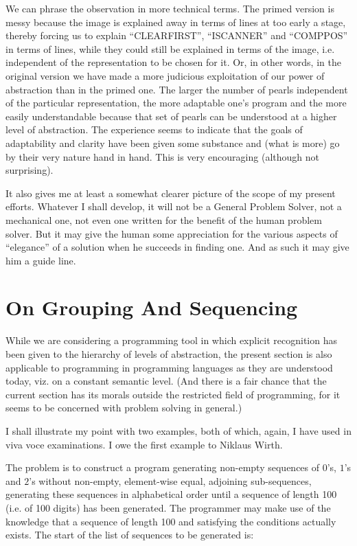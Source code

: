We can phrase the observation in more technical terms. The primed version is messy because the image is explained away in terms of lines at too early a stage, thereby forcing us to explain ``CLEARFIRST'', ``ISCANNER'' and ``COMPPOS'' in terms of lines, while they could still be explained in terms of the image, i.e. independent of the representation to be chosen for it. Or, in other words, in the original version we have made a more judicious exploitation of our power of abstraction than in the primed one. The larger the number of pearls independent of the particular representation, the more adaptable one's program and the more easily understandable \textemdash{}  because that set of pearls can be understood at a higher level of abstraction. The experience seems to indicate that the goals of adaptability and clarity have been given some substance and (what is more) go by their very nature hand in hand. This is very encouraging (although not surprising).

It also gives \textemdash{}  me at least \textemdash{}  a somewhat clearer picture of the scope of my present efforts. Whatever I shall develop, it will not be a General Problem Solver, not a mechanical one, not even one written for the benefit of the human problem solver. But it may give the human some appreciation for the various aspects of ``elegance'' of a solution when he succeeds in finding one. And as such it may give him a guide line.

\section[On grouping and sequencing]{On Grouping And Sequencing}
\label{sec:grouping-and-sequencing}

While we are considering a programming tool in which explicit recognition has been given to the hierarchy of levels of abstraction, the present section is also applicable to programming in programming languages as they are understood today, viz. on a constant semantic level. (And there is a fair chance that the current section has its morals outside the restricted field of programming, for it seems to be concerned with problem solving in general.)

I shall illustrate my point with two examples, both of which, again, I have used in viva voce examinations. I owe the first example to Niklaus Wirth.

The problem is to construct a program generating non-empty sequences of $0$'s, $1$'s and $2$'s without non-empty, element-wise equal, adjoining sub-sequences, generating these sequences in alphabetical order until a sequence of length 100 (i.e. of 100 digits) has been generated. The programmer may make use of the knowledge that a sequence of length 100 and satisfying the conditions actually exists. The start of the list of sequences to be generated is:

